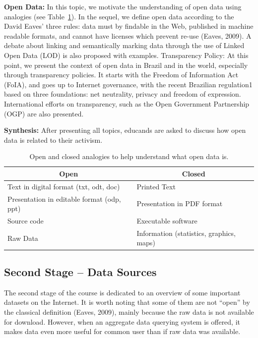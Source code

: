 \noindent \textbf{Open Data:} In this topic, we motivate the understanding of open data using analogies (see Table~\ref{tab:open_close}). In the sequel, we define open data according to the David Eaves' three rules: data must by findable in the Web, published in machine readable formats, and cannot have licenses which prevent re-use (Eaves, 2009). A debate about linking and semantically marking data through the use of Linked Open Data (LOD) is also proposed with examples.
Transparency Policy: At this point, we present the context of open data in Brazil and in the world, especially through transparency policies. It starts with the Freedom of Information Act (FoIA), and goes up to Internet governance, with the recent Brazilian regulation1 based on three foundations: net neutrality, privacy and freedom of expression. International efforts on transparency, such as the Open Government Partnership (OGP) are also presented.

\noindent \textbf{Synthesis:} After presenting all topics, educands are asked to discuss how open data is related to their activism.

\begin{table}[]
\centering
\ABNTEXfontereduzida
\caption{Open and closed analogies to help understand what open data is.}
\label{tab:open_close}
\begin{tabular}{|l|l|}
\hline
\multicolumn{1}{|c|}{\textbf{Open}}        & \multicolumn{1}{c|}{\textbf{Closed}}           \\ \hline
Text in digital format (txt, odt, doc)     & Printed Text                                   \\ \hline
Presentation in editable format (odp, ppt) & Presentation in PDF format \\ \hline
Source code                                & Executable software                            \\ \hline
Raw Data                                   & Information (statistics, graphics, maps)       \\ \hline
\end{tabular}
\end{table}

\subsection{Second Stage – Data Sources}

The second stage of the course is dedicated to an overview of some important datasets on the Internet. It is worth noting that some of them are not “open” by the classical definition (Eaves, 2009), mainly because the raw data is not available for download. However, when an aggregate data querying system is offered, it makes data even more useful for common user than if raw data was available.


